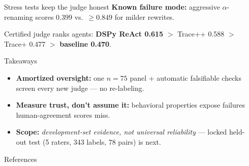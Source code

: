 \documentclass[final]{beamer}
\newlength{\sepwidth}
\newlength{\colwidth}
\newcommand{\separatorcolumn}{\begin{column}{\sepwidth}\end{column}}
\begin{document}
\begin{frame}[t]
\begin{columns}[t]
\begin{column}{\colwidth}
\begin{block}{Stress tests keep the judge honest}
    \textbf{Known failure mode:} aggressive $\alpha$-renaming scores $0.399$ vs.\ $\geq 0.849$ for milder rewrites.

    \medskip
    Certified judge ranks agents: \textbf{DSPy ReAct 0.615} $>$ Trace++ 0.588 $>$ Trace+ 0.477 $>$ \textbf{baseline 0.470}.

  \end{block}

  \vspace{0.4cm}
  \begin{alertblock}{Takeaways}

    \begin{itemize}
      \setlength{\leftmargini}{2.2em}
      \setlength{\itemsep}{0.9ex}
      \item \textbf{Amortized oversight:} one $n{=}75$ panel + automatic falsifiable checks screen every new judge --- no re-labeling.
      \item \textbf{Measure trust, don't assume it:} behavioral properties expose failures human-agreement scores miss.
      \item \textbf{Scope:} \emph{development-set evidence, not universal reliability} --- locked held-out test (5 raters, 343 labels, 78 pairs) is next.
    \end{itemize}

  \end{alertblock}

  \vspace{-0.85cm}
  \begin{block}{References}

    \nocite{Zheng2023MTBench,TongZhang2024CodeJudge}
    {\small\setlength{\parskip}{0pt}\setlength{\itemsep}{0pt}\setlength{\parsep}{0pt}}

  \end{block}

\end{column}

\separatorcolumn
\end{columns}
\end{frame}
\end{document}
